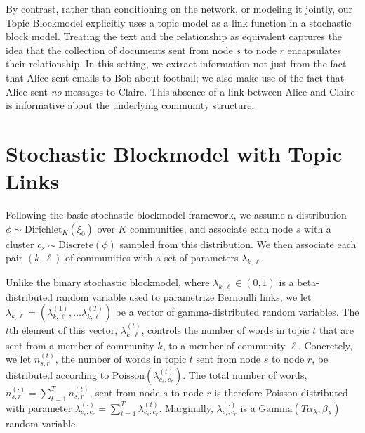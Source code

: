         By contrast, rather than conditioning on the network, or modeling it jointly, our Topic Blockmodel explicitly uses a topic model as a link function in a stochastic block model.  Treating the text and the relationship as equivalent captures the idea that the collection of documents sent from node $s$ to node $r$ encapsulates their relationship. In this setting, we extract information not just from the fact that Alice sent emails to Bob about football; we also make use of the fact that Alice sent \textit{no} messages to Claire. This absence of a link between Alice and Claire is informative about the underlying community structure.

\section{Stochastic Blockmodel with Topic Links}\label{sec:model}
    
    Following the basic stochastic blockmodel framework, we assume a distribution $\phi\sim \mbox{Dirichlet}_K(\xi_0)$ over $K$ communities, and associate each node $s$ with a cluster $c_s \sim\mbox{Discrete}(\phi)$ sampled from this distribution. We then associate each pair $(k,\ell)$ of communities with a set of parameters $\lambda_{k,\ell}$.
    
    Unlike the binary stochastic blockmodel, where $\lambda_{k,\ell}\in (0,1)$ is a beta-distributed random variable used to parametrize Bernoulli links, we let $\lambda_{k,\ell}=(\lambda_{k,\ell}^{(1)},\dots  \lambda_{k,\ell}^{(T)})$ be a vector of gamma-distributed random variables. The $t$th element of this vector, $\lambda_{k,\ell}^{(t)}$, controls the number of words in topic $t$ that are sent from a member of community $k$, to a member of community $\ell$. Concretely, we let $n_{s,r}^{(t)}$, the number of words in topic $t$ sent from node $s$ to node $r$, be distributed according to $\mbox{Poisson}(\lambda_{c_s,c_r}^{(t)})$. The total number of words, $n_{s,r}^{(\cdot)} = \sum_{t=1}^Tn_{s,r}^{(t)}$, sent from node $s$ to node $r$ is therefore Poisson-distributed with parameter $\lambda_{c_s,c_r}^{(\cdot)}=\sum_{t=1}^T \lambda_{c_s,c_r}^{(t)}$. Marginally, $\lambda_{c_s, c_r}^{(\cdot)}$ is a $\mbox{Gamma}(T\alpha_\lambda, \beta_\lambda)$ random variable.
    
